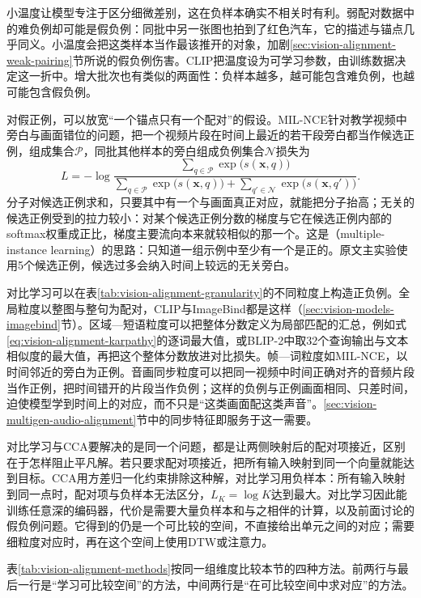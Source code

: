小温度让模型专注于区分细微差别，这在负样本确实不相关时有利。弱配对数据中的难负例却可能是假负例：同批中另一张图也拍到了红色汽车，它的描述与锚点几乎同义。小温度会把这类样本当作最该推开的对象，加剧\ref{sec:vision-alignment-weak-pairing}节所说的假负例伤害。CLIP把温度设为可学习参数，由训练数据决定这一折中。增大批次也有类似的两面性：负样本越多，越可能包含难负例，也越可能包含假负例。

对假正例，可以放宽“一个锚点只有一个配对”的假设。MIL-NCE针对教学视频中旁白与画面错位的问题，把一个视频片段在时间上最近的若干段旁白都当作候选正例，组成集合$\mathcal P$，同批其他样本的旁白组成负例集合$\mathcal N$损失为
\begin{equation}
  L=-\log
  \frac{\sum_{q\in\mathcal P}\exp\bigl(s(\bm x,q)\bigr)}
       {\sum_{q\in\mathcal P}\exp\bigl(s(\bm x,q)\bigr)
        +\sum_{q'\in\mathcal N}\exp\bigl(s(\bm x,q')\bigr)}.
  \label{eq:vision-alignment-milnce}
\end{equation}
分子对候选正例求和，只要其中有一个与画面真正对应，就能把分子抬高；无关的候选正例受到的拉力较小：对某个候选正例分数的梯度与它在候选正例内部的softmax权重成正比，梯度主要流向本来就较相似的那一个。这是（multiple-instance learning）的思路：只知道一组示例中至少有一个是正的。原文主实验使用5个候选正例，候选过多会纳入时间上较远的无关旁白。

对比学习可以在表\ref{tab:vision-alignment-granularity}的不同粒度上构造正负例。全局粒度以整图与整句为配对，CLIP与ImageBind都是这样（\ref{sec:vision-models-imagebind}节）。区域—短语粒度可以把整体分数定义为局部匹配的汇总，例如式\eqref{eq:vision-alignment-karpathy}的逐词最大值，或BLIP-2中取32个查询输出与文本相似度的最大值，再把这个整体分数放进对比损失。帧—词粒度如MIL-NCE，以时间邻近的旁白为正例。音画同步粒度可以把同一视频中时间正确对齐的音频片段当作正例，把时间错开的片段当作负例；这样的负例与正例画面相同、只差时间，迫使模型学到时间上的对应，而不只是“这类画面配这类声音”。\ref{sec:vision-multigen-audio-alignment}节中的同步特征即服务于这一需要。

对比学习与CCA要解决的是同一个问题，都是让两侧映射后的配对项接近，区别在于怎样阻止平凡解。若只要求配对项接近，把所有输入映射到同一个向量就能达到目标。CCA用方差归一化约束排除这种解，对比学习用负样本：所有输入映射到同一点时，配对项与负样本无法区分，$L_K=\log K$达到最大。对比学习因此能训练任意深的编码器，代价是需要大量负样本和与之相伴的计算，以及前面讨论的假负例问题。它得到的仍是一个可比较的空间，不直接给出单元之间的对应；需要细粒度对应时，再在这个空间上使用DTW或注意力。

表\ref{tab:vision-alignment-methods}按同一组维度比较本节的四种方法。前两行与最后一行是“学习可比较空间”的方法，中间两行是“在可比较空间中求对应”的方法。

